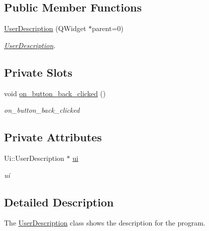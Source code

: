 \subsection*{Public Member Functions}
\begin{DoxyCompactItemize}
\item 
\hyperlink{class_user_description_a07117ea9e660fd6ae0a7ecc569edf0f6}{User\+Description} (Q\+Widget $\ast$parent=0)
\begin{DoxyCompactList}\small\item\em \hyperlink{class_user_description}{User\+Description}. \end{DoxyCompactList}\end{DoxyCompactItemize}
\subsection*{Private Slots}
\begin{DoxyCompactItemize}
\item 
\mbox{\label{class_user_description_ae232b80f4876e81c7e12b67e7b5ae5b4}} 
void \hyperlink{class_user_description_ae232b80f4876e81c7e12b67e7b5ae5b4}{on\+\_\+button\+\_\+back\+\_\+clicked} ()
\begin{DoxyCompactList}\small\item\em on\+\_\+button\+\_\+back\+\_\+clicked \end{DoxyCompactList}\end{DoxyCompactItemize}
\subsection*{Private Attributes}
\begin{DoxyCompactItemize}
\item 
\mbox{\label{class_user_description_aa83478d5f0908966a808aaab072ba84d}} 
Ui\+::\+User\+Description $\ast$ \hyperlink{class_user_description_aa83478d5f0908966a808aaab072ba84d}{ui}
\begin{DoxyCompactList}\small\item\em ui \end{DoxyCompactList}\end{DoxyCompactItemize}


\subsection{Detailed Description}
The \hyperlink{class_user_description}{User\+Description} class shows the description for the program. 

